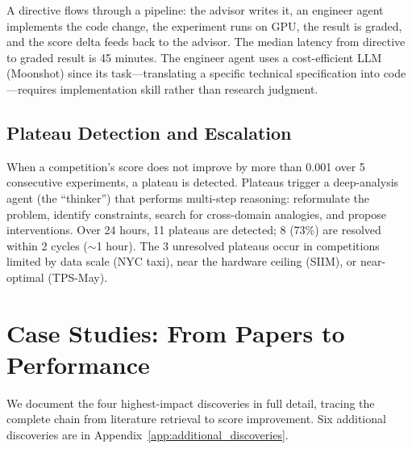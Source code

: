 \documentclass{article}
\begin{document}
A directive flows through a pipeline: the advisor writes it, an engineer agent implements the code change, the experiment runs on GPU, the result is graded, and the score delta feeds back to the advisor. The median latency from directive to graded result is 45 minutes. The engineer agent uses a cost-efficient LLM (Moonshot) since its task---translating a specific technical specification into code---requires implementation skill rather than research judgment.

\subsection{Plateau Detection and Escalation}
\label{sec:plateau}

When a competition's score does not improve by more than 0.001 over 5 consecutive experiments, a plateau is detected. Plateaus trigger a deep-analysis agent (the ``thinker'') that performs multi-step reasoning: reformulate the problem, identify constraints, search for cross-domain analogies, and propose interventions. Over 24 hours, 11 plateaus are detected; 8 (73\%) are resolved within 2 cycles ($\sim$1 hour). The 3 unresolved plateaus occur in competitions limited by data scale (NYC taxi), near the hardware ceiling (SIIM), or near-optimal (TPS-May).

\section{Case Studies: From Papers to Performance}
\label{sec:discoveries}

We document the four highest-impact discoveries in full detail, tracing the complete chain from literature retrieval to score improvement. Six additional discoveries are in Appendix~\ref{app:additional_discoveries}.
\end{document}
